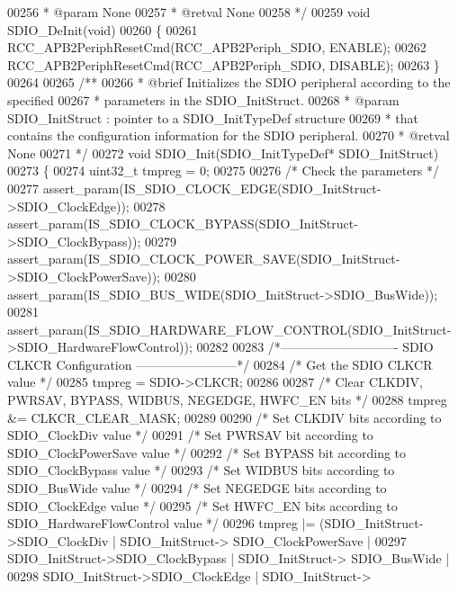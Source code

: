 \begin{DoxyCode}
00256 \textcolor{comment}{  * @param  None}
00257 \textcolor{comment}{  * @retval None}
00258 \textcolor{comment}{  */}
00259 \textcolor{keywordtype}{void} SDIO_DeInit(\textcolor{keywordtype}{void})
00260 \{
00261   RCC_APB2PeriphResetCmd(RCC_APB2Periph_SDIO, ENABLE);
00262   RCC_APB2PeriphResetCmd(RCC_APB2Periph_SDIO, DISABLE);
00263 \}
00264 
00265 \textcolor{comment}{/**}
00266 \textcolor{comment}{  * @brief  Initializes the SDIO peripheral according to the specified }
00267 \textcolor{comment}{  *         parameters in the SDIO\_InitStruct.}
00268 \textcolor{comment}{  * @param  SDIO\_InitStruct : pointer to a SDIO\_InitTypeDef structure }
00269 \textcolor{comment}{  *         that contains the configuration information for the SDIO peripheral.}
00270 \textcolor{comment}{  * @retval None}
00271 \textcolor{comment}{  */}
00272 \textcolor{keywordtype}{void} SDIO_Init(SDIO\_InitTypeDef* SDIO\_InitStruct)
00273 \{
00274   uint32\_t tmpreg = 0;
00275 
00276   \textcolor{comment}{/* Check the parameters */}
00277   assert_param(IS\_SDIO\_CLOCK\_EDGE(SDIO\_InitStruct->SDIO\_ClockEdge));
00278   assert_param(IS\_SDIO\_CLOCK\_BYPASS(SDIO\_InitStruct->SDIO\_ClockBypass));
00279   assert_param(IS\_SDIO\_CLOCK\_POWER\_SAVE(SDIO\_InitStruct->SDIO\_ClockPowerSave));
00280   assert_param(IS\_SDIO\_BUS\_WIDE(SDIO\_InitStruct->SDIO\_BusWide));
00281   assert_param(IS\_SDIO\_HARDWARE\_FLOW\_CONTROL(SDIO\_InitStruct->SDIO\_HardwareFlowControl));
00282 
00283 \textcolor{comment}{/*---------------------------- SDIO CLKCR Configuration ------------------------*/}
00284   \textcolor{comment}{/* Get the SDIO CLKCR value */}
00285   tmpreg = SDIO->CLKCR;
00286 
00287   \textcolor{comment}{/* Clear CLKDIV, PWRSAV, BYPASS, WIDBUS, NEGEDGE, HWFC\_EN bits */}
00288   tmpreg &= CLKCR_CLEAR_MASK;
00289 
00290   \textcolor{comment}{/* Set CLKDIV bits according to SDIO\_ClockDiv value */}
00291   \textcolor{comment}{/* Set PWRSAV bit according to SDIO\_ClockPowerSave value */}
00292   \textcolor{comment}{/* Set BYPASS bit according to SDIO\_ClockBypass value */}
00293   \textcolor{comment}{/* Set WIDBUS bits according to SDIO\_BusWide value */}
00294   \textcolor{comment}{/* Set NEGEDGE bits according to SDIO\_ClockEdge value */}
00295   \textcolor{comment}{/* Set HWFC\_EN bits according to SDIO\_HardwareFlowControl value */}
00296   tmpreg |= (SDIO\_InitStruct->SDIO_ClockDiv  | SDIO\_InitStruct->
      SDIO_ClockPowerSave |
00297              SDIO\_InitStruct->SDIO_ClockBypass | SDIO\_InitStruct->
      SDIO_BusWide |
00298              SDIO\_InitStruct->SDIO_ClockEdge | SDIO\_InitStruct->

\end{DoxyCode}
